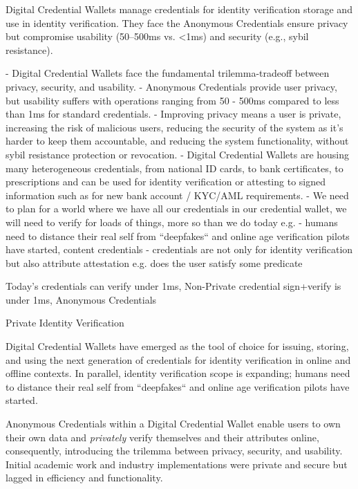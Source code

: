 Digital Credential Wallets manage credentials for identity verification  storage and use in identity verification. They face the 
Anonymous Credentials ensure privacy but compromise usability (50–500ms vs. <1ms) and security (e.g., sybil resistance).


- Digital Credential Wallets face the fundamental trilemma-tradeoff between privacy, security, and usability. 
- Anonymous Credentials provide user privacy, but usability suffers with operations ranging from 50 - 500ms compared to less than 1ms for standard credentials. 
- Improving privacy means a user is private, increasing the risk of malicious users, reducing the security of the system as it's harder to keep them accountable, and reducing the system functionality, without sybil resistance protection or revocation. 
- Digital Credential Wallets are housing many heterogeneous credentials, from national ID cards, to bank certificates, to prescriptions and can be used for identity verification or attesting to signed information such as for new bank account / KYC/AML requirements. 
- We need to plan for a world where we have all our credentials in our credential wallet, we will need to verify for loads of things, more so than we do today e.g.
- humans need to distance their real self from ``deepfakes`` and online age verification pilots have started, content credentials
- credentials are not only for identity verification but also attribute attestation e.g. does the user satisfy some predicate




Today's credentials can verify under 1ms, 
Non-Private credential sign+verify is under 1ms, Anonymous Credentials


Private Identity Verification 


Digital Credential Wallets have emerged as the tool of choice for issuing, storing, and using the next generation of credentials for identity verification in online and offline contexts. In parallel, identity verification scope is expanding;  humans need to distance their real self from ``deepfakes`` and online age verification pilots have started. 



Anonymous Credentials within a Digital Credential Wallet enable users to own their own data and \emph{privately} verify themselves and their attributes online, consequently, introducing the trilemma between privacy, security, and usability. Initial academic work and industry implementations were private and secure but lagged in efficiency and functionality. 


